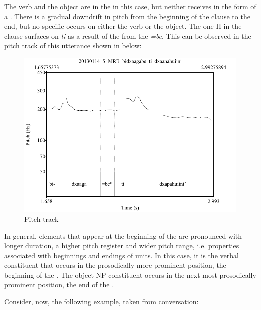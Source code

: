The verb and the object are in the  in this case, but neither receives  in the form of a . There is a gradual downdrift in pitch from the beginning of the clause to the end, but no specific  occurs on either the verb or the object. The one H  in the clause surfaces on \textit{ti} as a result of the  from the  \textit{=be}. This can be observed in the pitch track of this utterance shown in  below:

\begin{figure} 
\caption{Pitch track}
\label{fig:5:dxaapahuiini}
\includegraphics[height=.4\textheight]{dxaapahuiini}
\end{figure}


In general, elements that appear at the beginning of the  are pronounced with longer duration, a higher pitch register and wider pitch range, i.e. properties associated with beginnings and endings of  units. In this case, it is the verbal constituent that occurs in the prosodically more prominent position, the beginning of the . The object NP constituent occurs in the next most prosodically prominent position, the end of the .

Consider, now, the following example, taken from conversation:

